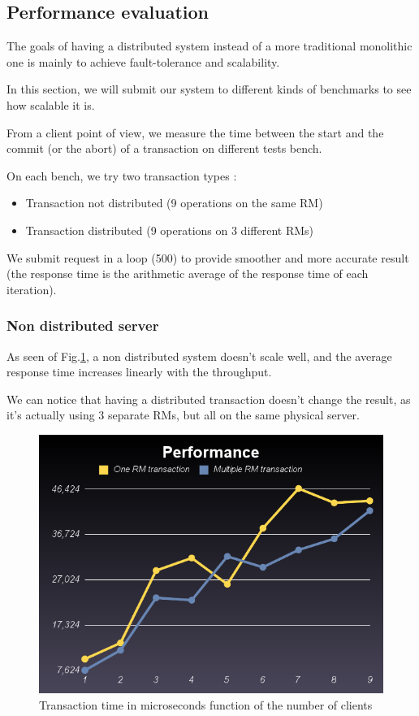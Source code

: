 \documentclass[a4paper]{article}
\begin{document}
\subsection{Performance evaluation}
\label{perf}
The goals of having a distributed system instead of a more traditional monolithic one is mainly to achieve fault-tolerance and scalability.

In this section, we will submit our system to different kinds of benchmarks to see how scalable it is.

From a client point of view, we measure the time between the start and the commit (or the abort) of a transaction on different tests bench.

On each bench, we try two transaction types :
\begin{itemize}
\item Transaction not distributed (9 operations on the same RM)
\item Transaction distributed (9 operations on 3 different RMs)
\end{itemize}

We submit request in a loop (500) to provide smoother and more accurate result (the response time is the arithmetic average of the response time of each iteration).

\subsubsection{Non distributed server}

As seen of Fig.\ref{oneserver}, a non distributed system doesn't scale well, and the average response time increases linearly with the throughput.

We can notice that having a distributed transaction doesn't change the result, as it's actually using 3 separate RMs, but all on the same physical server.

\begin{figure}[h!]
  \centering
	\includegraphics[scale=0.6]{oc_linear.png}
  \caption{Transaction time in microseconds function of the number of clients}
  \label{oneserver}
\end{figure}
\end{document}
